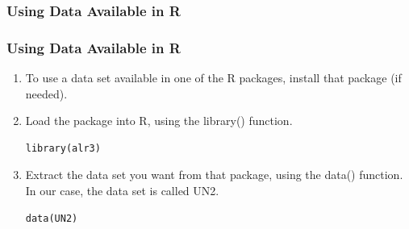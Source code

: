 
\subsubsection{Using Data Available in R}

\begin{frame}[fragile]
  \frametitle{Using Data Available in R}
\begin{enumerate}
\item To use a data set available in one of the R packages, install that package (if needed).

\item Load the package into R, using the \ttfamily library() \normalfont function. \\
	\begin{lstlisting}
library(alr3)
	\end{lstlisting}

\item Extract the data set you want from that package, using the \ttfamily data() \normalfont function.  In our case, the data set is called \ttfamily UN2. \\
	\begin{lstlisting}
data(UN2)
	\end{lstlisting}

\end{enumerate}
\end{frame}

